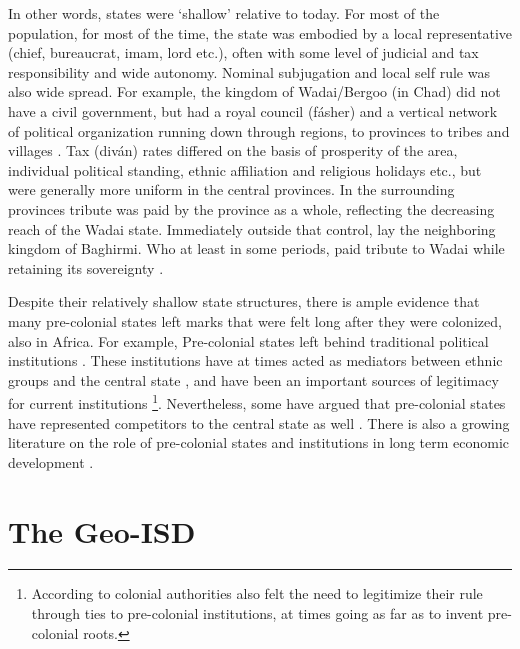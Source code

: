 \documentclass[12pt]{article}
\begin{document}

In other words, states were `shallow' relative to today. For most of the
population, for most of the time, the state was embodied by a local
representative (chief, bureaucrat, imam, lord etc.), often with some level of
judicial and tax responsibility and wide autonomy. Nominal subjugation and local
self rule was also wide spread. For example, the kingdom of Wadai/Bergoo (in
Chad) did not have a civil government, but had a royal council (fásher) and a
vertical network of political organization running down through regions, to
provinces to tribes and villages \citep{barth1857travels}. Tax (diván) rates
differed on the basis of prosperity of the area, individual political standing,
ethnic affiliation and religious holidays etc., but were generally more uniform
in the central provinces. In the surrounding provinces tribute was paid by the
province as a whole, reflecting the decreasing reach of the Wadai state.
Immediately outside that control, lay the neighboring kingdom of Baghirmi. Who
at least in some periods, paid tribute to Wadai while retaining its sovereignty
\citep{barth1857travels}.

Despite their relatively shallow state structures, there is ample evidence that
many pre-colonial states left marks that were felt long after they were
colonized, also in Africa. For example, Pre-colonial states left behind
traditional political institutions \citep{Beall_2005, Holzinger_2020,
Neupert_Wentz_2021, Ubink_2008}. These institutions have at times acted as
mediators between ethnic groups and the central state \citep{boone2014property,
Englebert2002}, and have been an important sources of legitimacy for current
institutions \citep{Wig2016}\footnote{According to \citet{mamdani2018citizen}
	colonial authorities also felt the need to legitimize their rule through
	ties to pre-colonial institutions, at times going as far as to invent
pre-colonial roots.}. Nevertheless, some have argued that pre-colonial states
have represented competitors to the central state as well \citep{Herbst2014}.
There is also a growing literature on the role of pre-colonial states and
institutions in long term economic development \citep{Michalopoulos2018,
Acemoglu2014, Gennaioli2007, Bockstette2002, Wilfahrt_2021}.

\section{The Geo-ISD} \label{The Geo-ISD}
\end{document}
